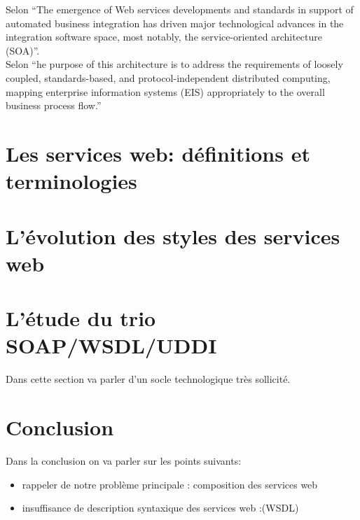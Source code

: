 	    Selon \cite{Papazoglou:2007:SOA:1265289.1265298} ``The emergence of Web services developments and 
	    standards in support of automated business integration has driven major technological advances in the 
	    integration software space, most notably, the service-oriented architecture (SOA)''.\\

	    Selon \cite{Fremantle:2002:ES:570907.570935} ``he purpose of this architecture is to address the 
	    requirements of loosely coupled, standards-based, and protocol-independent distributed computing, 
	    mapping enterprise information systems (EIS) appropriately to the overall business process flow.''\\
	    
    \section{Les services web: définitions et terminologies}
	\cite{srivastava2003web}

    \section{L'évolution des styles des services web}


    \section{L'étude du trio SOAP/WSDL/UDDI}
	Dans cette section va parler d'un socle technologique très sollicité.


    \section{Conclusion}
	Dans la conclusion on va parler sur les points suivants:\\
    \begin{itemize}	
	\item {rappeler de notre problème principale : composition des services web }
	\item {insuffisance de description syntaxique des services web :(WSDL)}
    \end{itemize}


    
